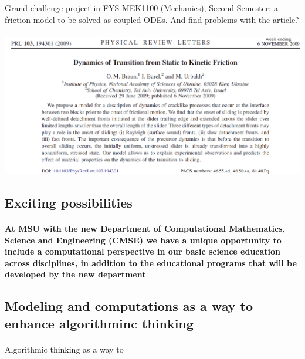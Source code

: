 \documentclass[%
twoside,                 %
final,                   %
10pt]{article}
\begin{document}
Grand challenge project in FYS-MEK1100 (Mechanics), Second Semester: a friction model to be solved as coupled ODEs. And find problems with the article?



\paragraph{}


\centerline{\includegraphics[width=0.5\linewidth]{figures/prl2.png}}




\subsection{Exciting possibilities}

\paragraph{}

\textbf{At MSU with the new Department of Computational Mathematics, Science and Engineering (CMSE) we have a unique opportunity to include a computational perspective in our basic science education across disciplines, in addition to the educational programs that will be developed by the new department}.




\subsection{Modeling and computations as a way to enhance algorithminc thinking}

\paragraph{}

Algorithmic  thinking as a way to
\end{document}
